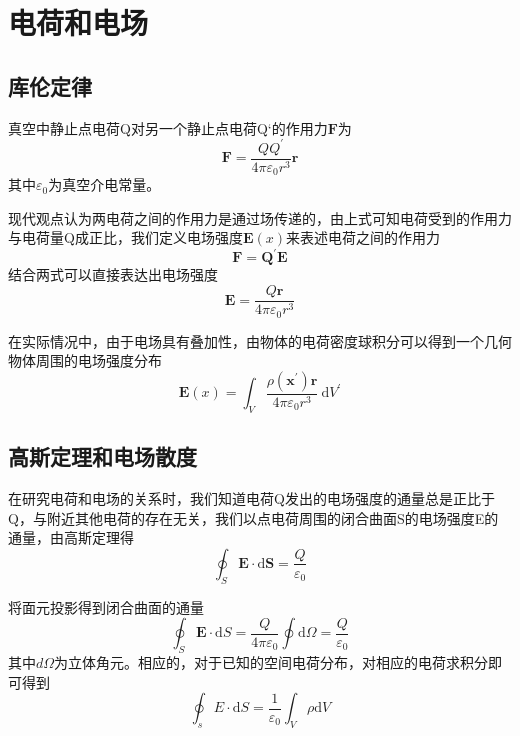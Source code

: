 \section{电荷和电场}
	\subsection{库伦定律}
		真空中静止点电荷Q对另一个静止点电荷Q`的作用力$\boldsymbol{F}$为
			\begin{equation}
			\boldsymbol{F}=\frac{Q Q^{\prime}}{4 \pi \varepsilon_{0} r^{3}} \boldsymbol{r}
			\end{equation}
		其中$\varepsilon_{0}$为真空介电常量。

		现代观点认为两电荷之间的作用力是通过场传递的，由上式可知电荷受到的作用力与电荷量Q成正比，我们定义电场强度$\boldsymbol{E}(x)$来表述电荷之间的作用力
		\begin{equation}
		\boldsymbol{F}=\boldsymbol{Q}^{\prime} \boldsymbol{E}
		\end{equation}
		结合两式可以直接表达出电场强度
		\begin{equation}
			\boldsymbol{E}=\frac{Q \boldsymbol{r}}{4 \pi \varepsilon_{0} r^{3}}
		\end{equation}

		在实际情况中，由于电场具有叠加性，由物体的电荷密度球积分可以得到一个几何物体周围的电场强度分布
		\begin{equation}
		\boldsymbol{E}(x)=\int_{V} \frac{\rho\left(\boldsymbol{x}^{\prime}\right) \boldsymbol{r}}{4 \pi \varepsilon_{0} r^{3}} \mathrm{~d} V^{\prime}
		\end{equation}
	\subsection{高斯定理和电场散度}
		在研究电荷和电场的关系时，我们知道电荷Q发出的电场强度的通量总是正比于Q，与附近其他电荷的存在无关，我们以点电荷周围的闭合曲面S的电场强度E的通量，由高斯定理得
		\begin{equation}
			\oint_{S} \boldsymbol{E} \cdot \mathrm{d} \boldsymbol{S}= \frac{Q}{\varepsilon_0}
		\end{equation}

		将面元投影得到闭合曲面的通量
		\begin{equation}
			\oint_{S} \boldsymbol{E} \cdot \mathrm{d} S=\frac{Q}{4 \pi \varepsilon_{0}} \oint \mathrm{d} \Omega=\frac{Q}{\varepsilon_{0}}
		\end{equation}
		其中$d \Omega$为立体角元。相应的，对于已知的空间电荷分布，对相应的电荷求积分即可得到
		\begin{equation}
			\oint_{s} E \cdot \mathrm{d} S=\frac{1}{\varepsilon_{0}} \int_{V} \rho \mathrm{d} V
		\label{fig.电场通量积分式}
		\end{equation}

